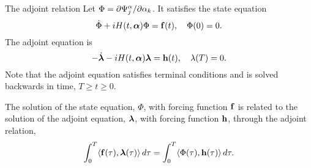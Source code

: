 \documentclass{beamer}
\begin{document}
\begin{frame}{The adjoint relation}
 Let $\Phi = \partial \Psi_j^\alpha / \partial \alpha_k$. It satisfies the state equation
 \[
 \dot{\Phi} + i H(t,\boldsymbol{\alpha}) \Phi = {\bf f}(t), \quad \Phi(0) = 0.
  \]
  The adjoint equation is
  \[
  - \dot{\boldsymbol{\lambda}} - i H(t,\boldsymbol{\alpha}) \boldsymbol{\lambda} = {\bf h}(t),\quad \lambda(T) = 0.
  \]
  Note that the adjoint equation satisfies terminal conditions and is solved backwards in time,
  $T\geq t \geq 0$.

  The solution of the state equation, $\Phi$, with forcing function ${\bf f}$ is related to the solution
  of the adjoint equation, $\boldsymbol{\lambda}$, with forcing function ${\bf h}$, through the adjoint relation,
  \[
  \int_0^T \langle {\bf f}(\tau), \boldsymbol{\lambda}(\tau) \rangle\, d\tau =
  \int_0^T \langle \Phi(\tau), {\bf h}(\tau) \rangle\, d\tau.
  \]
\end{frame}
\end{document}
